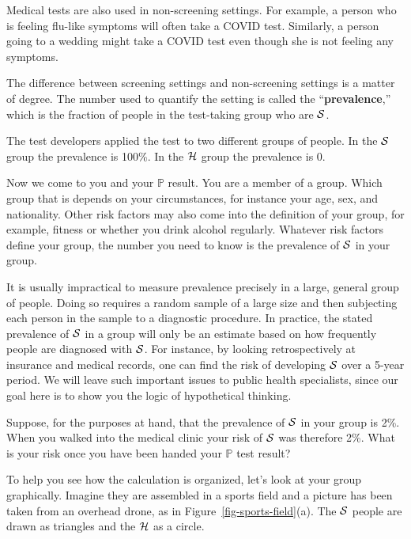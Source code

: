 \documentclass[
  letterpaper,
  DIV=11,
  numbers=noendperiod,
  oneside]{scrartcl}
\begin{document}
Medical tests are also used in non-screening settings. For example, a
person who is feeling flu-like symptoms will often take a COVID test.
Similarly, a person going to a wedding might take a COVID test even
though she is not feeling any symptoms.

The difference between screening settings and non-screening settings is
a matter of degree. The number used to quantify the setting is called
the ``\textbf{prevalence},'' which is the fraction of people in the
test-taking group who are \({\cal S}\).

The test developers applied the test to two different groups of people.
In the \({\cal S}\) group the prevalence is 100\%. In the \({\cal H}\)
group the prevalence is 0.

Now we come to you and your \({\mathbb{P}}\) result. You are a member of
a group. Which group that is depends on your circumstances, for instance
your age, sex, and nationality. Other risk factors may also come into
the definition of your group, for example, fitness or whether you drink
alcohol regularly. Whatever risk factors define your group, the number
you need to know is the prevalence of \({\cal S}\) in your group.

It is usually impractical to measure prevalence precisely in a large,
general group of people. Doing so requires a random sample of a large
size and then subjecting each person in the sample to a diagnostic
procedure. In practice, the stated prevalence of \({\cal S}\) in a group
will only be an estimate based on how frequently people are diagnosed
with \({\cal S}\). For instance, by looking retrospectively at insurance
and medical records, one can find the risk of developing \({\cal S}\)
over a 5-year period. We will leave such important issues to public
health specialists, since our goal here is to show you the logic of
hypothetical thinking.

Suppose, for the purposes at hand, that the prevalence of \({\cal S}\)
in your group is 2\%. When you walked into the medical clinic your risk
of \({\cal S}\) was therefore 2\%. What is your risk once you have been
handed your \({\mathbb{P}}\) test result?

To help you see how the calculation is organized, let's look at your
group graphically. Imagine they are assembled in a sports field and a
picture has been taken from an overhead drone, as in
Figure~\ref{fig-sports-field}(a). The \({\cal S}\) people are drawn as
triangles and the \({\cal H}\) as a circle.
\end{document}
